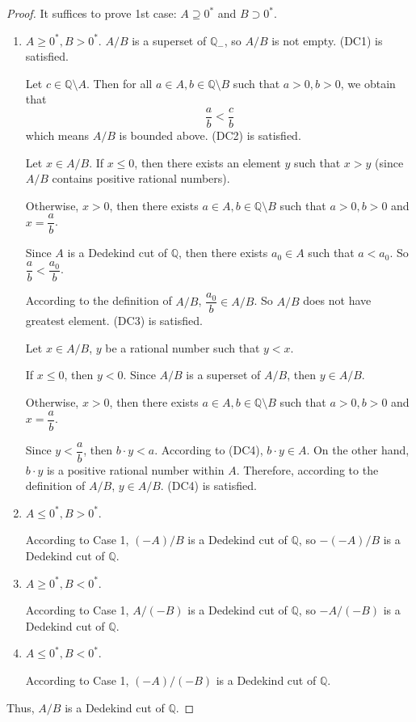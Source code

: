 \begin{proof}
    It suffices to prove 1st case: $A\supseteq {0}^{*}$ and $B\supset {0}^{*}$.

    \begin{enumerate}[label={\textbf{Case \arabic*.}},itemindent=0.4cm]
        \item $A\ge {0}^{*}, B > {0}^{*}$.
              $A/B$ is a superset of $\mathbb{Q}_{-}$, so $A/B$ is not empty. (DC1) is satisfied.
              \bigskip

              Let $c\in\mathbb{Q}\setminus A$. Then for all $a\in A, b\in\mathbb{Q}\setminus B$ such that $a > 0, b > 0$, we obtain that
              \[
                  \frac{a}{b} < \frac{c}{b}
              \]
              which means $A/B$ is bounded above. (DC2) is satisfied.
              \bigskip

              Let $x\in A/B$. If $x\le 0$, then there exists an element $y$ such that $x > y$ (since $A/B$ contains positive rational numbers).

              Otherwise, $x > 0$, then there exists $a\in A, b\in\mathbb{Q}\setminus B$ such that $a > 0, b > 0$ and $x = \dfrac{a}{b}$.

              Since $A$ is a Dedekind cut of $\mathbb{Q}$, then there exists $a_{0}\in A$ such that $a < a_{0}$. So $\dfrac{a}{b} < \dfrac{a_{0}}{b}$.

              According to the definition of $A/B$, $\dfrac{a_{0}}{b}\in A/B$. So $A/B$ does not have greatest element. (DC3) is satisfied.
              \bigskip

              Let $x\in A/B$, $y$ be a rational number such that $y < x$.

              If $x\le 0$, then $y < 0$. Since $A/B$ is a superset of $A/B$, then $y\in A/B$.

              Otherwise, $x > 0$, then there exists $a\in A, b\in\mathbb{Q}\setminus B$ such that $a > 0, b > 0$ and $x = \dfrac{a}{b}$.

              Since $y < \dfrac{a}{b}$, then $b\cdot y < a$. According to (DC4), $b\cdot y\in A$. On the other hand, $b\cdot y$ is a positive rational number within $A$. Therefore, according to the definition of $A/B$, $y\in A/B$. (DC4) is satisfied.
        \item $A\le {0}^{*}, B > {0}^{*}$.

              According to Case 1, $(-A)/B$ is a Dedekind cut of $\mathbb{Q}$, so $-(-A)/B$ is a Dedekind cut of $\mathbb{Q}$.
        \item $A\ge {0}^{*}, B < {0}^{*}$.

              According to Case 1, $A/(-B)$ is a Dedekind cut of $\mathbb{Q}$, so $-A/(-B)$ is a Dedekind cut of $\mathbb{Q}$.
        \item $A\le {0}^{*}, B < {0}^{*}$.

              According to Case 1, $(-A)/(-B)$ is a Dedekind cut of $\mathbb{Q}$.
    \end{enumerate}

    Thus, $A/B$ is a Dedekind cut of $\mathbb{Q}$.
\end{proof}

